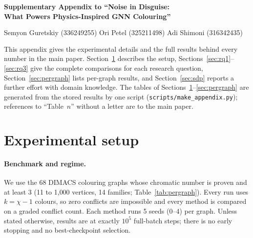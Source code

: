 \documentclass[11pt]{article}
\begin{document}
\onecolumn
\begin{center}
{\Large\bfseries Supplementary Appendix to ``Noise in Disguise:\\[2pt]
What Powers Physics-Inspired GNN Colouring''\par}
\vspace{1em}
{\large Semyon Guretskiy (336249255) \quad Ori Petel (325211498) \quad Adi Shimoni (316342435)\par}
\vspace{1.5em}
\end{center}

\noindent This appendix gives the experimental details and the full results behind every number
in the main paper. Section~\ref{sec:setup} describes the setup, Sections~\ref{sec:rq1}--\ref{sec:rq3}
give the complete comparisons for each research question, Section~\ref{sec:pergraph} lists
per-graph results, and Section~\ref{sec:sdp} reports a further effort with domain knowledge. The
tables of Sections~\ref{sec:setup}--\ref{sec:pergraph} are generated from the stored results by one
script (\texttt{scripts/make\_appendix.py}); references to ``Table~$n$'' without a letter are to the
main paper.

\section{Experimental setup}
\label{sec:setup}

\paragraph{Benchmark and regime.} We use the 68 DIMACS colouring graphs whose chromatic number is
proven and at least 3 (11 to 1{,}000 vertices, 14 families; Table~\ref{tab:pergraph}). Every run uses
$k=\chi-1$ colours, so zero conflicts are impossible and every method is compared on a graded conflict
count. Each method runs 5 seeds (0--4) per graph. Unless stated otherwise, results are at exactly
$10^5$ full-batch steps; there is no early stopping and no best-checkpoint selection.
\end{document}
